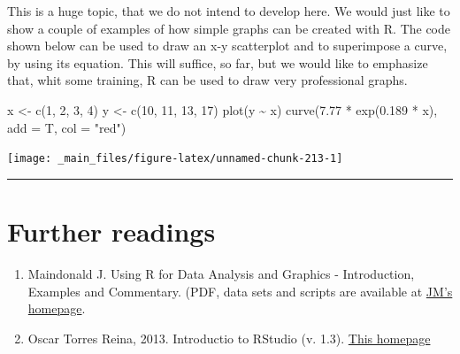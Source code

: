 \documentclass[a4paper,12pt,oneside]{book}
\providecommand{\tightlist}{%
  \setlength{\itemsep}{0pt}\setlength{\parskip}{0pt}}
\newenvironment{Shaded}{\begin{snugshade}}{\end{snugshade}}
\newcommand{\DecValTok}[1]{#1}
\newcommand{\FloatTok}[1]{#1}
\newcommand{\SpecialCharTok}[1]{#1}
\newcommand{\StringTok}[1]{#1}
\newcommand{\OtherTok}[1]{#1}
\newcommand{\FunctionTok}[1]{#1}
\newcommand{\AttributeTok}[1]{#1}
\newcommand{\NormalTok}[1]{#1}
\begin{document}
This is a huge topic, that we do not intend to develop here. We would just like to show a couple of examples of how simple graphs can be created with R. The code shown below can be used to draw an x-y scatterplot and to superimpose a curve, by using its equation. This will suffice, so far, but we would like to emphasize that, whit some training, R can be used to draw very professional graphs.

\begin{Shaded}
\begin{Highlighting}[]
\NormalTok{x  }\OtherTok{\textless{}{-}}  \FunctionTok{c}\NormalTok{(}\DecValTok{1}\NormalTok{, }\DecValTok{2}\NormalTok{, }\DecValTok{3}\NormalTok{, }\DecValTok{4}\NormalTok{)}
\NormalTok{y  }\OtherTok{\textless{}{-}}  \FunctionTok{c}\NormalTok{(}\DecValTok{10}\NormalTok{, }\DecValTok{11}\NormalTok{, }\DecValTok{13}\NormalTok{, }\DecValTok{17}\NormalTok{)}
\FunctionTok{plot}\NormalTok{(y }\SpecialCharTok{\textasciitilde{}}\NormalTok{ x)}
\FunctionTok{curve}\NormalTok{(}\FloatTok{7.77} \SpecialCharTok{*} \FunctionTok{exp}\NormalTok{(}\FloatTok{0.189} \SpecialCharTok{*}\NormalTok{ x), }\AttributeTok{add =}\NormalTok{ T, }\AttributeTok{col =} \StringTok{"red"}\NormalTok{)}
\end{Highlighting}
\end{Shaded}

\texttt{[image: \_main\_files/figure-latex/unnamed-chunk-213-1]}

\begin{center}\rule{0.5\linewidth}{0.5pt}\end{center}

\hypertarget{further-readings-12}{%
\section{Further readings}\label{further-readings-12}}

\begin{enumerate}
\def\labelenumi{\arabic{enumi}.}
\tightlist
\item
  Maindonald J. Using R for Data Analysis and Graphics - Introduction, Examples and Commentary. (PDF, data sets and scripts are available at \href{https://cran.r-project.org/doc/contrib/usingR.pdff}{JM's homepage}.
\item
  Oscar Torres Reina, 2013. Introductio to RStudio (v. 1.3). \href{https://dss.princeton.edu/training/RStudio101.pdf}{This homepage}
\end{enumerate}
\end{document}
